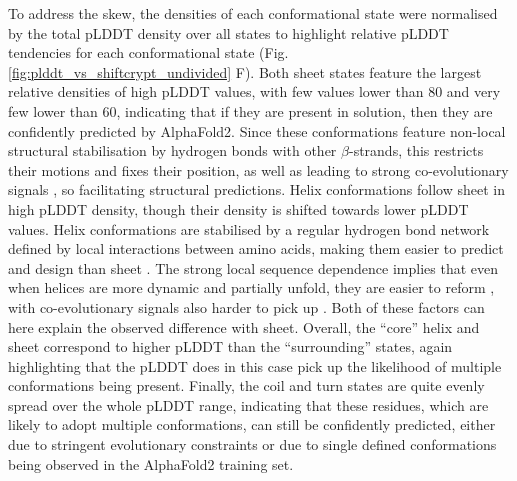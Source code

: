 To address the skew, the densities of each conformational state were normalised by the total pLDDT density over all states to highlight relative pLDDT tendencies for each conformational state (Fig. \ref{fig:plddt_vs_shiftcrypt_undivided} F). Both sheet states feature the largest relative densities of high pLDDT values, with few values lower than 80 and very few lower than 60, indicating that if they are present in solution, then they are confidently predicted by AlphaFold2. Since these conformations feature non-local structural stabilisation by hydrogen bonds with other $\beta$-strands, this restricts their motions and fixes their position, as well as leading to strong co-evolutionary signals \cite{sabzekar_protein_2017, jeong_improving_2008, aydin_bayesian_2011}, so facilitating structural predictions. Helix conformations follow sheet in high pLDDT density, though their density is shifted towards lower pLDDT values. Helix conformations are stabilised by a regular hydrogen bond network defined by local interactions between amino acids, making them easier to predict and design than sheet \cite{bryson_protein_1995}. The strong local sequence dependence implies that even when helices are more dynamic and partially unfold, they are easier to reform \cite{acharyya_exposing_2019, jesus_one_2018, taylor_calorimetric_1999}, with co-evolutionary signals also harder to pick up \cite{abrusan_alpha_2016}. Both of these factors can here explain the observed difference with sheet. Overall, the ``core'' helix and sheet correspond to higher pLDDT than the ``surrounding'' states, again highlighting that the pLDDT does in this case pick up the likelihood of multiple conformations being present. Finally, the coil and turn states are quite evenly spread over the whole pLDDT range, indicating that these residues, which are likely to adopt multiple conformations, can still be confidently predicted, either due to stringent evolutionary constraints or due to single defined conformations being observed in the AlphaFold2 training set. 

